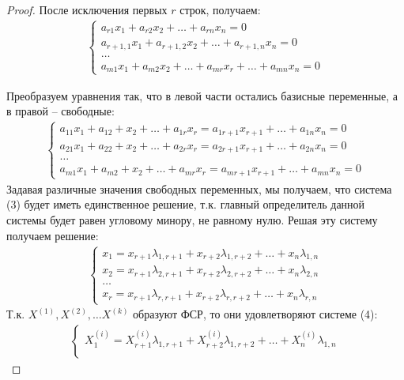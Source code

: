 \begin{proof}
  После исключения первых $r$ строк, получаем:
  \begin{gather*}
    \begin{cases}
      a_{r1} x_1 + a_{r2} x_2 + \ldots + a_{rn} x_{n} = 0 \\
      a_{r+1,1} x_1 + a_{r+1,2} x_2 + \ldots + a_{r+1,n} x_{n} = 0 \\
      \ldots \\
      a_{m1} x_1 + a_{m2} x_2 + \ldots + a_{mr} x_{r} + \ldots + a_{mn} x_{n} = 0
    \end{cases} \tag{2}
  \end{gather*}

  Преобразуем уравнения так, что в левой части остались базисные переменные, а в правой -- свободные:
  \begin{gather*}
    \begin{cases}
      a_{11} x_1 + a_{12} + x_2 + \ldots + a_{1r} x_{r} = a_{1r+1} x_{r+1} + \ldots + a_{1n} x_{n} = 0 \\
      a_{21} x_1 + a_{22} + x_2 + \ldots + a_{2r} x_{r} = a_{2r+1} x_{r+1} + \ldots + a_{2n} x_{n} = 0 \\
    \ldots \\
      a_{m1} x_1 + a_{m2} + x_2 + \ldots + a_{mr} x_{r} = a_{mr+1} x_{r+1} + \ldots + a_{mn} x_{n} = 0 \tag{3}
    \end{cases}
  \end{gather*}
  Задавая различные значения свободных переменных, мы получаем, что система (3) будет иметь единственное решение, т.к. главный определитель данной системы будет равен угловому минору, не равному нулю.
  Решая эту систему получаем решение:
  \begin{gather*}
    \begin{cases}
      x_1 = x_{r+1} \lambda_{1,r+1} + x_{r+2} \lambda_{1,r+2} + \ldots + x_{n} \lambda_{1, n} \\
      x_2 = x_{r+1} \lambda_{2,r+1} + x_{r+2} \lambda_{2,r+2} + \ldots + x_{n} \lambda_{2, n} \\
      \ldots \\
      x_r = x_{r+1} \lambda_{r,r+1} + x_{r+2} \lambda_{r,r+2} + \ldots + x_{n} \lambda_{r, n} \tag{4}
    \end{cases}
  \end{gather*}
  Т.к. $X^{(1)}, X^{(2)}, \ldots X^{(k)}$ образуют ФСР, то они удовлетворяют системе (4):
  \begin{gather*}
    \begin{cases}
      X_1^{(i)} = X_{r+1}^{(i)} \lambda_{1,r+1} + X_{r+2}^{(i)} \lambda_{1,r+2} + \ldots + X_{n}^{(i)} \lambda_{1, n} \\

\end{cases}
\end{gather*}
\end{proof}
